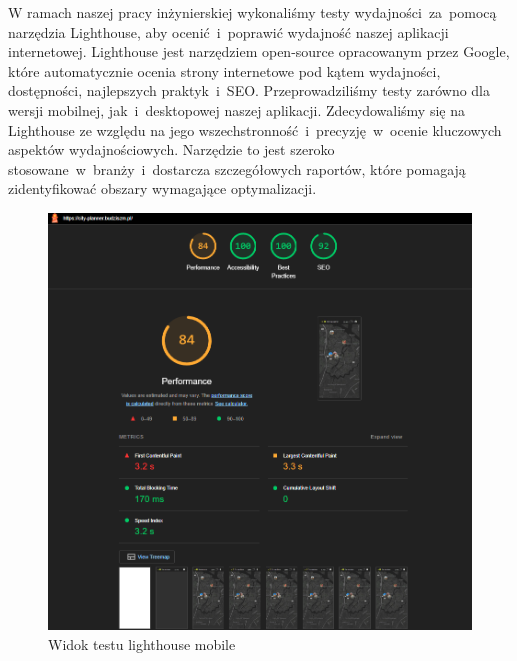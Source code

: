 W ramach naszej pracy inżynierskiej wykonaliśmy testy wydajności~za~pomocą narzędzia Lighthouse, aby ocenić~i~poprawić wydajność naszej aplikacji internetowej. \newline
Lighthouse jest narzędziem open-source opracowanym przez Google, które automatycznie ocenia strony internetowe pod kątem wydajności, dostępności, najlepszych praktyk~i~SEO. \newline
Przeprowadziliśmy testy zarówno dla wersji mobilnej, jak~i~desktopowej naszej aplikacji. \newline
Zdecydowaliśmy się na Lighthouse ze względu na jego wszechstronność~i~precyzję~w~ocenie kluczowych aspektów wydajnościowych.  \newline
Narzędzie to jest szeroko stosowane~w~branży~i~dostarcza szczegółowych raportów, które pomagają zidentyfikować obszary wymagające optymalizacji. \newline
\begin{figure}[H]
    \centering
    \includegraphics[width=1\textwidth]{attachments/lighthouse-mobile}
    \caption{Widok testu lighthouse mobile}
    \label{fig:testy-lighthouse-mobile}
    \end{figure}

